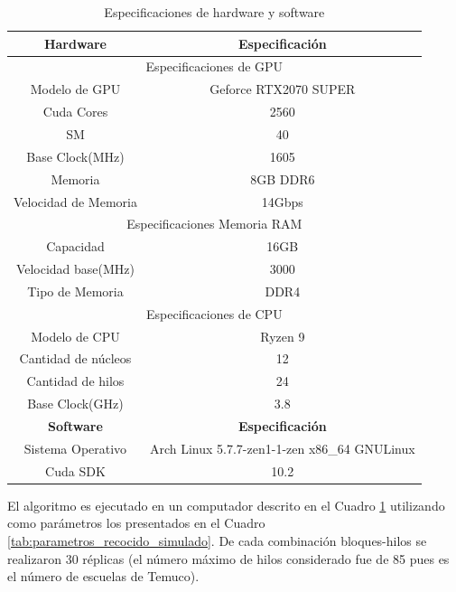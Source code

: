 \begin{table}
    \centering
    \caption{Especificaciones de hardware y software}
    \resizebox{\columnwidth}{!} {
    \begin{tabular}{|c|c|}
        \hline
        \textbf{Hardware}&
        \textbf{Especificación}\\
        \hline
        \multicolumn{2}{|c|}{Especificaciones de GPU}\\
        \hline
        Modelo de GPU & Geforce RTX2070 SUPER \\
        Cuda Cores & 2560\\
        SM & 40\\
        Base Clock(MHz) & 1605\\
        Memoria & 8GB DDR6 \\
        Velocidad de Memoria & 14Gbps \\
        \hline
        \multicolumn{2}{|c|}{Especificaciones Memoria RAM}\\
        \hline
        Capacidad &  16GB \\
        Velocidad base(MHz) & 3000 \\
        Tipo de Memoria & DDR4 \\
        \hline
        \multicolumn{2}{|c|}{Especificaciones de CPU}\\
        \hline
        Modelo de CPU & Ryzen 9 \\
        Cantidad de núcleos & 12\\
        Cantidad de hilos & 24\\
        Base Clock(GHz) & 3.8 \\
        \hline
        \textbf{Software}&
        \textbf{Especificación}\\
        \hline
        Sistema Operativo & Arch Linux 5.7.7-zen1-1-zen x86\_64 GNU\/Linux\\
        Cuda SDK & 10.2 \\
        \hline
    \end{tabular}
    }
    \label{tab:computador}
\end{table}


El algoritmo es ejecutado en un computador descrito en el Cuadro \ref{tab:computador} utilizando como parámetros los presentados en el Cuadro \ref{tab:parametros_recocido_simulado}. De cada combinación bloques-hilos se realizaron 30 réplicas (el número máximo de hilos considerado fue de 85 pues es el número de escuelas de Temuco).

